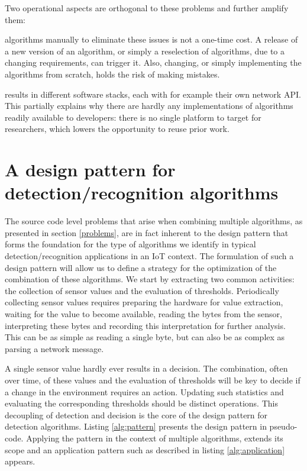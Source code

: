 \documentclass[3p,times,procedia]{elsarticle}
\begin{document}
Two operational aspects are orthogonal to these problems and further amplify
them:

\begin{description}[style=unboxed,leftmargin=0cm]
  
  \item[Reimplementing] algorithms manually to eliminate these issues is
  not a one-time cost. A release of a new version of an algorithm, or simply a
  reselection of algorithms, due to a changing requirements, can trigger it.
  Also, changing, or simply implementing the algorithms from scratch, holds the
  risk of making mistakes.

  \item[The heterogeneity of IoT devices] results in different software stacks,
  each with for example their own network API\@. This partially explains why
  there are hardly any implementations of algorithms readily available to
  developers: there is no single platform to target for researchers, which
  lowers the opportunity to reuse prior work.

\end{description}

\section{A design pattern for detection/recognition algorithms}
\label{pattern}

The source code level problems that arise when combining multiple algorithms,
as presented in section \ref{problems}, are in fact inherent to the design
pattern that forms the foundation for the type of algorithms we identify in
typical detection/recognition applications in an IoT context. The formulation
of such a design pattern will allow us to define a strategy for the
optimization of the combination of these algorithms. We start by extracting two
common activities: the collection of sensor values and the evaluation of
thresholds. Periodically collecting sensor values requires preparing the
hardware for value extraction, waiting for the value to become available,
reading the bytes from the sensor, interpreting these bytes and recording this
interpretation for further analysis. This can be as simple as reading a single
byte, but can also be as complex as parsing a network message.

A single sensor value hardly ever results in a decision. The combination, often
over time, of these values and the evaluation of thresholds will be key to
decide if a change in the environment requires an action. Updating such
statistics and evaluating the corresponding thresholds should be distinct
operations. This decoupling of detection and decision is the core of the design
pattern for detection algorithms. Listing \ref{alg:pattern} presents the design
pattern in pseudo-code. Applying the pattern in the context of multiple
algorithms, extends its scope and an application pattern such as described in
listing \ref{alg:application} appears.
\end{document}
